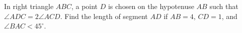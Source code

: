 In right triangle $ABC$, a point $D$ is chosen on the hypotenuse $AB$ such that $\angle ADC=2\angle ACD$. Find the length of segment $AD$ if $AB=4$, $CD=1$, and $\angle BAC<45^{\circ}$.
